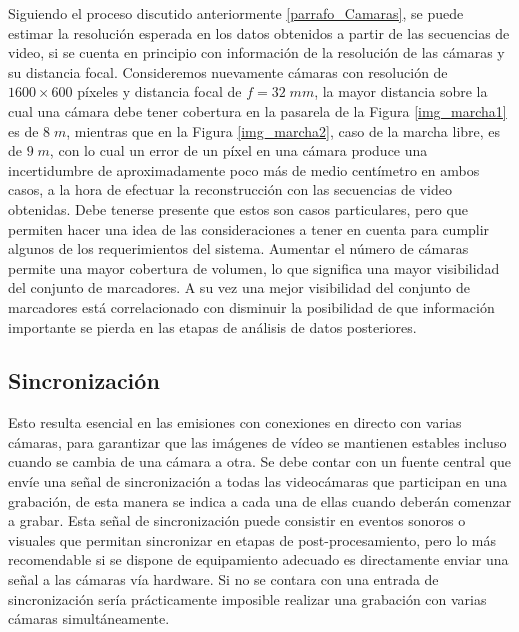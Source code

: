 Siguiendo el proceso discutido anteriormente \ref{parrafo_Camaras}, se puede estimar la resolución esperada en los datos obtenidos a partir de las secuencias de video, si se cuenta en principio con información de la resolución de las cámaras y su distancia focal. Consideremos nuevamente cámaras con resolución de $1600\times600$ píxeles y distancia focal de $f=32\;mm$, la mayor distancia sobre la cual una cámara debe tener cobertura en la pasarela de la Figura \ref{img_marcha1} es de $8 \;m$, mientras que en la Figura  \ref{img_marcha2}, caso de la marcha libre, es de $9\;m$, con lo cual un error de un píxel en una cámara produce una incertidumbre de aproximadamente poco más de medio centímetro en ambos casos, a la hora de efectuar la reconstrucción con las secuencias de video obtenidas. 
Debe tenerse presente que estos son casos particulares, pero que permiten hacer una idea de las consideraciones a tener en cuenta para cumplir algunos de los requerimientos del sistema. 
Aumentar el número de cámaras permite una mayor cobertura de volumen, lo que significa una mayor visibilidad del conjunto de marcadores. A su vez una mejor visibilidad del conjunto de marcadores está correlacionado con disminuir la posibilidad de que información importante se pierda en las etapas de análisis de datos posteriores.


\subsection{Sincronización} 

Esto resulta esencial en las emisiones con conexiones en directo con varias cámaras, para garantizar que las imágenes de vídeo se mantienen estables incluso cuando se cambia de una cámara a otra.
Se debe contar con un fuente central que envíe una señal de sincronización a todas las videocámaras que participan en una grabación, de esta manera se indica a cada una de ellas cuando deberán comenzar a grabar. 
Esta señal de sincronización puede consistir en eventos sonoros o visuales que permitan sincronizar en etapas de post-procesamiento, pero lo más recomendable si se dispone de equipamiento adecuado es directamente enviar una señal a las cámaras vía hardware.
Si no se contara con una entrada de sincronización sería prácticamente imposible realizar una grabación con varias cámaras simultáneamente.



